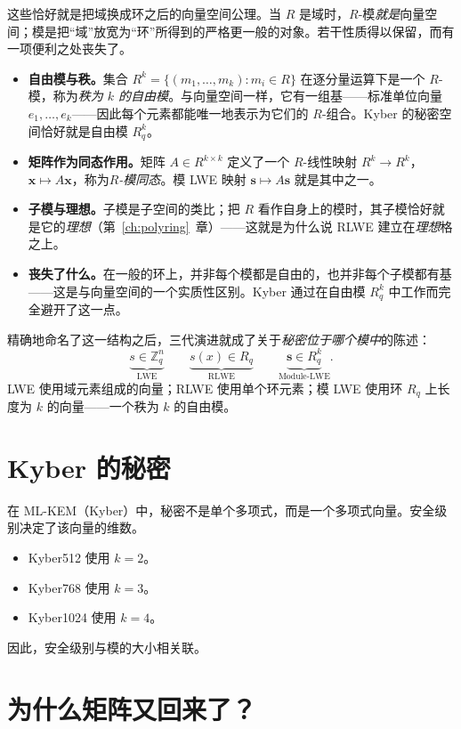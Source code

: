 这些恰好就是把域换成环之后的向量空间公理。当 $R$ 是域时，$R$-模\emph{就是}向量空间；模是把“域”放宽为“环”所得到的严格更一般的对象。若干性质得以保留，而有一项便利之处丧失了。

\begin{itemize}
  \item \textbf{自由模与秩。}集合 $R^{k}=\{(m_1,\dots,m_k):m_i\in R\}$ 在逐分量运算下是一个 $R$-模，称为\emph{秩为 $k$ 的自由模}。与向量空间一样，它有一组基——标准单位向量 $e_1,\dots,e_k$——因此每个元素都能唯一地表示为它们的 $R$-组合。Kyber 的秘密空间恰好就是自由模 $R_q^{k}$。
  \item \textbf{矩阵作为同态作用。}矩阵 $A\in R^{k\times k}$ 定义了一个 $R$-线性映射 $R^{k}\to R^{k}$，$\mathbf{x}\mapsto A\mathbf{x}$，称为\emph{$R$-模同态}。模 LWE 映射 $\mathbf{s}\mapsto A\mathbf{s}$ 就是其中之一。
  \item \textbf{子模与理想。}子模是子空间的类比；把 $R$ 看作自身上的模时，其子模恰好就是它的\emph{理想}（第~\ref{ch:polyring}~章）——这就是为什么说 RLWE 建立在\emph{理想}格之上。
  \item \textbf{丧失了什么。}在一般的环上，并非每个模都是自由的，也并非每个子模都有基——这是与向量空间的一个实质性区别。Kyber 通过在自由模 $R_q^{k}$ 中工作而完全避开了这一点。
\end{itemize}

精确地命名了这一结构之后，三代演进就成了关于\emph{秘密位于哪个模中}的陈述：
\[
\underbrace{s\in\mathbb{Z}_q^{n}}_{\text{LWE}}
\qquad
\underbrace{s(x)\in R_q}_{\text{RLWE}}
\qquad
\underbrace{\mathbf{s}\in R_q^{k}}_{\text{Module-LWE}}.
\]
LWE 使用域元素组成的向量；RLWE 使用单个环元素；模 LWE 使用环 $R_q$ 上长度为 $k$ 的向量——一个秩为 $k$ 的自由模。

\section{Kyber 的秘密}

在 ML-KEM（Kyber）中，秘密不是单个多项式，而是一个多项式向量。安全级别决定了该向量的维数。

\begin{itemize}
    \item Kyber512 使用 $k=2$。
    \item Kyber768 使用 $k=3$。
    \item Kyber1024 使用 $k=4$。
\end{itemize}

因此，安全级别与模的大小相关联。

\section{为什么矩阵又回来了？}

